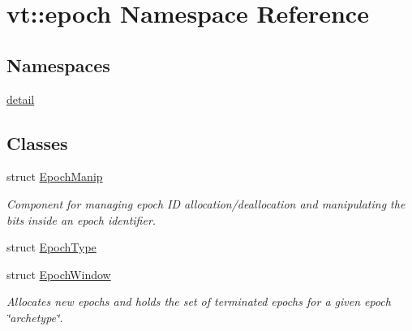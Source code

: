 \hypertarget{namespacevt_1_1epoch}{}\section{vt\+:\+:epoch Namespace Reference}
\label{namespacevt_1_1epoch}
\subsection*{Namespaces}
\begin{DoxyCompactItemize}
\item 
 \hyperlink{namespacevt_1_1epoch_1_1detail}{detail}
\end{DoxyCompactItemize}
\subsection*{Classes}
\begin{DoxyCompactItemize}
\item 
struct \hyperlink{structvt_1_1epoch_1_1_epoch_manip}{Epoch\+Manip}
\begin{DoxyCompactList}\small\item\em Component for managing epoch ID allocation/deallocation and manipulating the bits inside an epoch identifier. \end{DoxyCompactList}\item 
struct \hyperlink{structvt_1_1epoch_1_1_epoch_type}{Epoch\+Type}
\item 
struct \hyperlink{structvt_1_1epoch_1_1_epoch_window}{Epoch\+Window}
\begin{DoxyCompactList}\small\item\em Allocates new epochs and holds the set of terminated epochs for a given epoch \char`\"{}archetype\char`\"{}. \end{DoxyCompactList}\end{DoxyCompactItemize}
